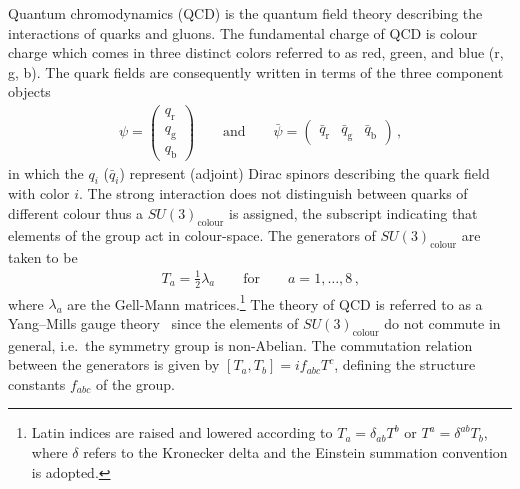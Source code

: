 Quantum chromodynamics (QCD) is the quantum field theory describing the
interactions of quarks and gluons. The fundamental charge of QCD is colour
charge which comes in three distinct colors referred to as red, green, and blue
(r, g, b). The quark fields are consequently written in terms of the three
component objects
\begin{align*}
  \psi =
  \begin{pmatrix}
    q_\text{r} \\
    q_\text{g} \\
    q_\text{b}
  \end{pmatrix}
  \qquad
  \text{and}
  \qquad
  \bar{\psi} =
  \begin{pmatrix}
    \bar{q}_\text{r} & \bar{q}_\text{g} & \bar{q}_\text{b}
  \end{pmatrix} \,\text{,}
\end{align*}
in which the $q_i$ ($\bar{q}_i$) represent (adjoint) Dirac spinors describing
the quark field with color $i$. The strong interaction does not distinguish
between quarks of different colour thus a $SU(3)_{\text{colour}}$ is assigned,
the subscript indicating that elements of the group act in colour-space. The
generators of $SU(3)_{\text{colour}}$ are taken to be
\begin{align*}
  T_a = \frac{1}{2} \lambda_a \qquad \text{for} \qquad a = 1, \dots, 8 \,\text{,}
\end{align*}
where $\lambda_a$ are the Gell-Mann matrices.\footnote{Latin indices are raised
  and lowered according to $T_a = \delta_{ab} T^b$ or $T^a = \delta^{ab} T_b$,
  where $\delta$ refers to the Kronecker delta and the Einstein summation
  convention is adopted.} The theory of QCD is referred to as a Yang--Mills
gauge theory~\cite{Yang:1954ek} since the elements of $SU(3)_{\text{colour}}$ do
not commute in general, i.e.\ the symmetry group is non-Abelian. The commutation
relation between the generators is given by $[T_a, T_b] = i f_{abc} T^c$,
defining the structure constants $f_{abc}$ of the group.

